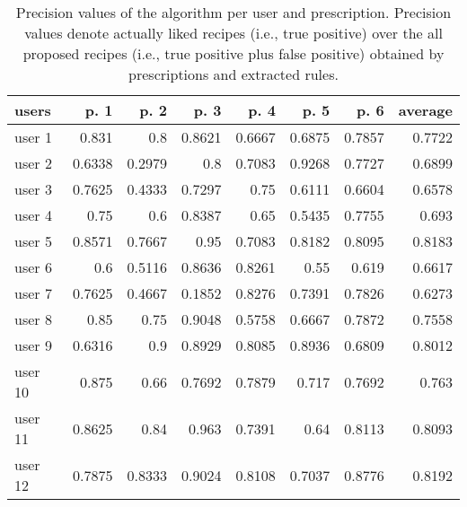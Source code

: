 \begin{table}%
    \centering
    \caption[Precision of proposed recipes per user and prescription]{%
        Precision values of the algorithm per user and prescription. Precision values denote actually liked recipes (i.e., true positive) over the all proposed recipes (i.e., true positive plus false positive) obtained by prescriptions and extracted rules.
    }
        \begin{tabular}{l||r|r|r|r|r|r||r}
            \textbf{users} & \textbf{p. 1} & \textbf{p. 2} & \textbf{p. 3} & \textbf{p. 4} & \textbf{p. 5} & \textbf{p. 6} & \textbf{average}\\
            \hline\hline
            user 1 & 0.831 & 0.8 & 0.8621 & 0.6667 & 0.6875 & 0.7857 & 0.7722\\
            user 2 & 0.6338 & 0.2979 & 0.8 & 0.7083 & 0.9268 & 0.7727 & 0.6899\\
            user 3 & 0.7625 & 0.4333 & 0.7297 & 0.75 & 0.6111 & 0.6604 & 0.6578\\
            user 4 & 0.75 & 0.6 & 0.8387 & 0.65 & 0.5435 & 0.7755 & 0.693\\
            user 5 & 0.8571 & 0.7667 & 0.95 & 0.7083 & 0.8182 & 0.8095 & 0.8183\\
            user 6 & 0.6 & 0.5116 & 0.8636 & 0.8261 & 0.55 & 0.619 & 0.6617\\
            user 7 & 0.7625 & 0.4667 & 0.1852 & 0.8276 & 0.7391 & 0.7826 & 0.6273\\
            user 8 & 0.85 & 0.75 & 0.9048 & 0.5758 & 0.6667 & 0.7872 & 0.7558\\
            user 9 & 0.6316 & 0.9 & 0.8929 & 0.8085 & 0.8936 & 0.6809 & 0.8012\\
            user 10 & 0.875 & 0.66 & 0.7692 & 0.7879 & 0.717 & 0.7692 & 0.763\\
            user 11 & 0.8625 & 0.84 & 0.963 & 0.7391 & 0.64 & 0.8113 & 0.8093\\
            user 12 & 0.7875 & 0.8333 & 0.9024 & 0.8108 & 0.7037 & 0.8776 & 0.8192\\
        \end{tabular}
    \label{tab:proposed-recipes-stats}
\end{table}

